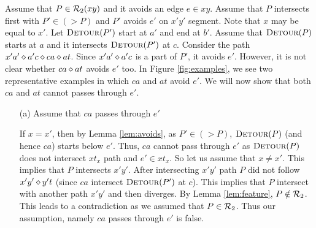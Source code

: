 \noindent Assume that $P \in \mathcal{R}_2(xy)$ and it avoids an edge $e \in xy$.
Assume that $P$  intersects first with $P' \in (> P)$ and $P'$ avoids $e'$ on $x'y'$ segment.
Note that $x$ may be equal to $x'$.
Let $\textsc{Detour}(P')$ start at $a'$ and end at
$b'$. Assume that $\textsc{Detour}(P)$ starts at $a$ and it intersects $\textsc{Detour}(P')$
at $c$.
Consider the path $x'a' \diamond a'c \diamond ca \diamond at$. Since $x'a' \diamond a'c$ is a part of $P'$,
it avoids $e'$. However, it is not clear whether $ca \diamond at$ avoids $e'$ too.
In Figure \ref{fig:examples}, we see two representative examples in which $ca$ and $at$
avoid $e'$.
\iflong
  We will now show that both $ca$   and $at$ cannot passes through $e'$.
  \begin{enumerate}
   \item[(a)] Assume that  $ca$ passes through $e'$ %
    \label{enum:goodcase}

  If $x=x'$, then by Lemma \ref{lem:avoids}, as $P' \in (>P)$, $\textsc{Detour}(P)$ (and hence $ca$)
   starts below $e'$. Thus, $ca$ cannot pass through $e'$ as $\textsc{Detour}(P)$ does not
  intersect $xt_x$ path and $e' \in xt_x$. So let us assume that $x \neq x'$.
  This implies that $P$ intersects $x'y'$. After intersecting $x'y'$ path
    $P$ did not follow $x'y' \diamond y't$ (since $ca$ intersect $\textsc{Detour}(P')$ at $c$).
    This implies that $P$ intersect with another path $x'y'$ and then
    diverges. By Lemma \ref{lem:feature}, $P \notin \mathcal{R}_2$.
    This leads to a contradiction as we assumed that $P \in \mathcal{R}_2$. Thus our
    assumption, namely $ca$ passes through
    $e'$ is false.






\end{enumerate}
